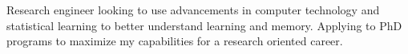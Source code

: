 Research engineer looking to use advancements in computer technology and
statistical learning to better understand learning and memory. Applying to PhD programs to maximize my capabilities for a research oriented career.
